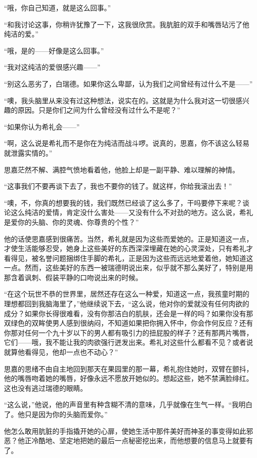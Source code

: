 \par “哦，你自己知道，就是这么回事。”
\par “和我讨论这事，你稍许犹豫了一下，这我很欣赏。我肮脏的双手和嘴唇玷污了他纯洁的爱。”
\par “哦，是的——好像是这么回事。”
\par “我对这纯洁的爱很感兴趣——”
\par “别这么恶劣了，白瑞德。如果你这么卑鄙，认为我们之间曾经有过什么不是——”
\par “噢，我头脑里从来没有过这种想法，说实在的。这就是为什么我对这一切很感兴趣的原因。只是你们之间为什么曾经没有过什么不是呢？”
\par “如果你认为希礼会——”
\par “啊，这么说是希礼而不是你在为纯洁而战斗啰。说真的，思嘉，你不该这么轻易就泄露实情的。”
\par 思嘉茫然不解、满腔气愤地看着他，他脸上却是一副平静、难以理解的神情。
\par “这事我们不要再谈下去了，我也不要你的钱了。就这样，你给我滚出去！”
\par “噢，不，你真的想要我的钱，我们既然已经谈了这么多了，干吗要停下来呢？谈论这么纯洁的爱情，肯定没什么害处——又没有什么不对劲的地方。这么说，希礼是爱你的头脑、你的灵魂、你尊贵的个性？”
\par 他的话使思嘉感到很痛苦。当然，希礼就是因为这些而爱她的。正是知道这一点，才使生活能够忍受，她身上这些美好的东西深深埋藏在她的心灵深处，只有希礼才看得见，被名誉问题捆绑住手脚的希礼，正是因为这些而远远地爱着他，她知道这一点。然而，这些美好的东西一被瑞德明说出来，似乎就不那么美好了，特别是用那含着讽刺、假装平静的口吻说出来的时候。
\par “在这个玩世不恭的世界里，居然还存在这么一种爱，知道这一点，我孩童时期的理想都回到我脑海里了，”他继续说下去，“这么说，他对你的爱就没有任何肉欲的成分？如果你长得很难看，没有你那洁白的肌肤，还会是一样的吗？如果你没有那双绿色的双眸使男人感到很纳闷，不知道如果把你拥入怀中，你会作何反应？还有你那对任何一个九十岁以下的男人都有吸引力的扭屁股的样子？还有那两片嘴唇，它们——哦，我不能让我的肉欲强行迸发出来。希礼对这些什么都看不见？或者说就算他看得见，他却一点也不动心？”
\par 思嘉的思绪不由自主地回到那天在果园里的那一幕，希礼抱住她时，双臂在颤抖，他的嘴唇吻着她的嘴唇，好像永远不愿放开她似的。想起这些，她不禁满脸绯红。这也没有逃过瑞德的眼睛。
\par “这么说，”他说，他的声音里有种含糊不清的意味，几乎就像在生气一样。“我明白了。他只是因为你的头脑而爱你。”
\par 他怎么敢用肮脏的手指撬开她的心扉，使她生活中那件美好而神圣的事变得如此邪恶？他正冷酷地、坚定地把她的最后一点秘密挖出来，而他想要的信息马上就要有了。
